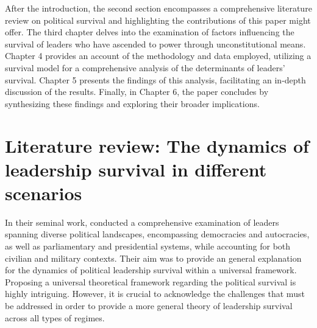 \documentclass[
  12pt,
  a4paper,
  12pt]{article}
\begin{document}
After the introduction, the second section encompasses a comprehensive
literature review on political survival and highlighting the
contributions of this paper might offer. The third chapter delves into
the examination of factors influencing the survival of leaders who have
ascended to power through unconstitutional means. Chapter 4 provides an
account of the methodology and data employed, utilizing a survival model
for a comprehensive analysis of the determinants of leaders' survival.
Chapter 5 presents the findings of this analysis, facilitating an
in-depth discussion of the results. Finally, in Chapter 6, the paper
concludes by synthesizing these findings and exploring their broader
implications.

\hypertarget{literature-review-the-dynamics-of-leadership-survival-in-different-scenarios}{%
\section{Literature review: The dynamics of leadership survival in
different
scenarios}\label{literature-review-the-dynamics-of-leadership-survival-in-different-scenarios}}

In their seminal work, \citet{buenodemesquita2003} conducted a
comprehensive examination of leaders spanning diverse political
landscapes, encompassing democracies and autocracies, as well as
parliamentary and presidential systems, while accounting for both
civilian and military contexts. Their aim was to provide an general
explanation for the dynamics of political leadership survival within a
universal framework. Proposing a universal theoretical framework
regarding the political survival is highly intriguing. However, it is
crucial to acknowledge the challenges that must be addressed in order to
provide a more general theory of leadership survival across all types of
regimes.
\end{document}
